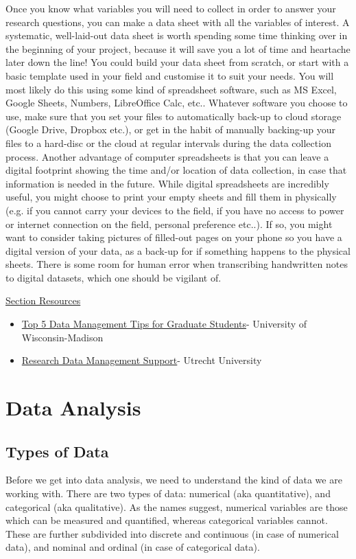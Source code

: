 \documentclass{article}
\begin{document}
Once you know what variables you will need to collect in order to answer your research questions, you can make a data sheet with all the variables of interest. A systematic, well-laid-out data sheet is worth spending some time thinking over in the beginning of your project, because it will save you a lot of time and heartache later down the line! You could build your data sheet from scratch, or start with a basic template used in your field and customise it to suit your needs. 
You will most likely do this using some kind of spreadsheet software, such as MS Excel, Google Sheets, Numbers, LibreOffice Calc, etc.. Whatever software you choose to use, make sure that you set your files to automatically back-up to cloud storage (Google Drive, Dropbox etc.), or get in the habit of manually backing-up your files to a hard-disc or the cloud at regular intervals during the data collection process. Another advantage of computer spreadsheets is that you can leave a digital footprint showing the time and/or location of data collection, in case that information is needed in the future. 
While digital spreadsheets are incredibly useful, you might choose to print your empty sheets and fill them in physically (e.g. if you cannot carry your devices to the field, if you have no access to power or internet connection on the field, personal preference etc..). If so, you might want to consider taking pictures of filled-out pages on your phone so you have a digital version of your data, as a back-up for if something happens to the physical sheets. There is some room for human error when transcribing handwritten notes to digital datasets, which one should be vigilant of. 

\underline{Section Resources}

\begin{itemize}
    \item \href{https://researchdata.wisc.edu/news/top-5-data-management-tips-for-graduate-students/}{Top 5 Data Management Tips for Graduate Students}- University of Wisconsin-Madison
    \item \href{https://www.uu.nl/en/research/research-data-management/guides/storing-and-preserving-data}{Research Data Management Support}- Utrecht University
\end{itemize}

\section{Data Analysis}
\subsection{Types of Data}
Before we get into data analysis, we need to understand the kind of data we are working with. There are two types of data: numerical (aka quantitative), and categorical (aka qualitative). As the names suggest, numerical variables are those which can be measured and quantified, whereas categorical variables cannot. These are further subdivided into discrete and continuous (in case of numerical data), and nominal and ordinal (in case of categorical data).
\end{document}

